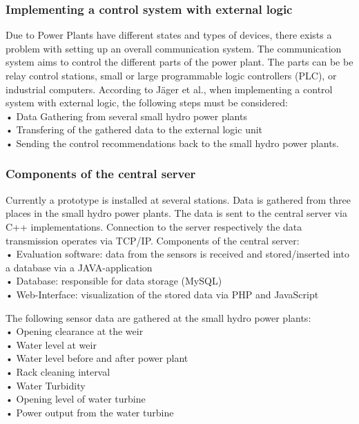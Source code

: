 \subsubsection{Implementing a control system with external logic}
Due to Power Plants have different states and types of devices, there exists a problem with setting up an overall communication system. The communication system aims to control the different parts of the power plant. The parts can be be relay control stations, small or large programmable logic controllers (PLC), or industrial computers.\cite{SEIT2017}
According to Jäger et al.\cite{SEIT2017}, when implementing a control system with external logic, the following steps must be considered: \\
• Data Gathering from several small hydro power plants\\
• Transfering of the gathered data to the external logic unit\\
• Sending the control recommendations back to the small hydro power plants.
\subsubsection{Components of the central server}
Currently a prototype is installed at several stations. Data is gathered from three places in the small hydro
power plants. The data is sent to the central server via C++ implementations. Connection to the server respectively
the data transmission operates via TCP/IP.\cite{SEIT2017} Components of the central server:\\
• Evaluation software: data from the sensors is received and stored/inserted into a database via a JAVA-application\\
• Database: responsible for data storage (MySQL)\\
• Web-Interface: visualization of the stored data via PHP and JavaScript

The following sensor data are gathered at the small hydro power plants: \\
• Opening clearance at the weir\\
• Water level at weir\\
• Water level before and after power plant\\
• Rack cleaning interval\\
• Water Turbidity\\
• Opening level of water turbine\\
• Power output from the water turbine\\
